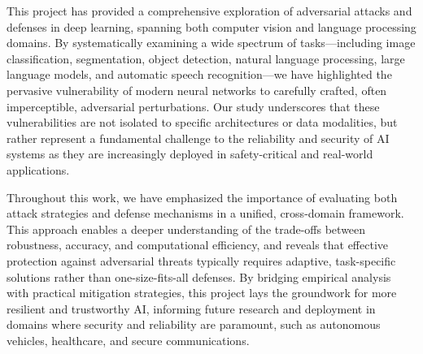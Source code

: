 \documentclass[../main.tex]{subfiles}
\begin{document}
This project has provided a comprehensive exploration of adversarial attacks and defenses in deep learning, spanning both computer vision and language processing domains. By systematically examining a wide spectrum of tasks—including image classification, segmentation, object detection, natural language processing, large language models, and automatic speech recognition—we have highlighted the pervasive vulnerability of modern neural networks to carefully crafted, often imperceptible, adversarial perturbations. Our study underscores that these vulnerabilities are not isolated to specific architectures or data modalities, but rather represent a fundamental challenge to the reliability and security of AI systems as they are increasingly deployed in safety-critical and real-world applications.

Throughout this work, we have emphasized the importance of evaluating both attack strategies and defense mechanisms in a unified, cross-domain framework. This approach enables a deeper understanding of the trade-offs between robustness, accuracy, and computational efficiency, and reveals that effective protection against adversarial threats typically requires adaptive, task-specific solutions rather than one-size-fits-all defenses. By bridging empirical analysis with practical mitigation strategies, this project lays the groundwork for more resilient and trustworthy AI, informing future research and deployment in domains where security and reliability are paramount, such as autonomous vehicles, healthcare, and secure communications.
\end{document}
